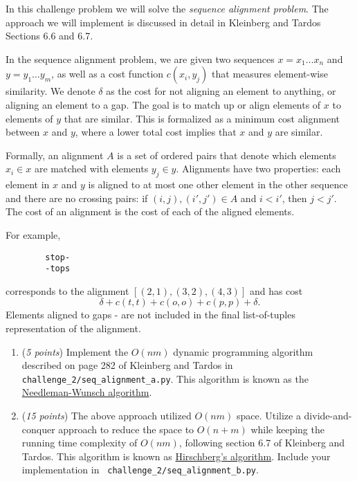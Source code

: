 \documentclass{hw}
\begin{document}
\begin{challenge}
    In this challenge problem we will solve the {\em sequence alignment problem}. The approach we will implement is discussed in detail in Kleinberg and Tardos Sections 6.6 and 6.7.
    
    In the sequence alignment problem, we are given two sequences $x=x_1\ldots x_n$ and
    $y=y_1\ldots y_m$, as well as a cost function $c(x_i,y_j)$ that measures element-wise similarity.
    We denote $\delta$ as the cost for not aligning an element to anything,
    or aligning an element to a gap.
    The goal is to match up or align elements of $x$ to elements of $y$ that are similar.
    This is formalized as a minimum cost alignment between $x$ and $y$,
    where a lower total cost implies that $x$ and $y$ are similar.
    
    Formally, an alignment $A$ is a set of ordered pairs that denote which elements $x_i \in x$ are matched with elements $y_j \in y$.
    Alignments have two properties:
    each element in $x$ and $y$ is aligned to at most one other element in the other sequence
    and there are no crossing pairs: if $(i, j), (i', j') \in A$ and $i < i'$, then $j < j'$.
    The cost of an alignment is the cost of each of the aligned elements. 
    
    For example,
    \begin{verbatim}
        stop-
        -tops
    \end{verbatim}
    corresponds to the alignment $[(2,1), (3,2), (4,3)]$ and has cost
    $$\delta + c(t,t) + c(o,o) + c(p,p) + \delta.$$
    Elements aligned to gaps - are not included in the final list-of-tuples representation of the alignment.
    
    \begin{enumerate}[label={(\alph*)}]
    \item (\textit{5 points})
    Implement the $O(nm)$ dynamic programming algorithm described on page 282 of Kleinberg and Tardos in \texttt{challenge\_2/seq\_alignment\_a.py}.
    This algorithm is known as the \href{https://en.wikipedia.org/wiki/Needleman-Wunsch\_algorithm}{Needleman-Wunsch algorithm}.
    
    
    \item(\textit{15 points})
    The above approach utilized $O(nm)$ space.
    Utilize a divide-and-conquer approach to reduce the space to $O(n+m)$
    while keeping the running time complexity of $O(nm)$,
    following section 6.7 of Kleinberg and Tardos.
    This algorithm is known as \href{https://en.wikipedia.org/wiki/Hirschberg's\_algorithm}{Hirschberg's algorithm}.
    Include your implementation in \texttt{ challenge\_2/seq\_alignment\_b.py}.
    \end{enumerate}


\end{challenge}
\end{document}
